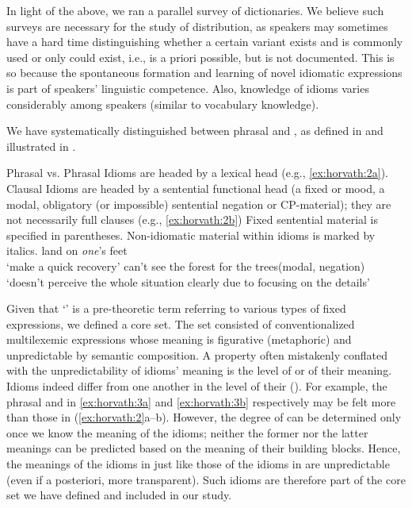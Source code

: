 \documentclass[output=paper,
modfonts
]{LSP/langsci}
\begin{document}
In light of the above, we ran a parallel survey of  
dictionaries. We believe such surveys are necessary for the study of
 distribution, as speakers may sometimes have a hard time
distinguishing whether a certain  variant exists and is commonly
used or only could exist, i.e., is a priori possible, but is not
documented. This is so because the spontaneous formation and learning of
novel idiomatic expressions is part of speakers' linguistic competence.
Also, knowledge of idioms varies considerably among speakers (similar to
vocabulary knowledge).

We have systematically distinguished between phrasal and ,
as defined in  and illustrated in .

\ea \label{ex:horvath:1} Phrasal vs. 
	\ea \label{ex:horvath:1a} Phrasal Idioms are headed by a lexical head (e.g., \ref{ex:horvath:2a}).
	\ex \label{ex:horvath:1b} Clausal Idioms are headed by a sentential functional head (a fixed
	 or mood, a modal, obligatory (or impossible) sentential negation
	or CP-material); they are not necessarily full clauses (e.g., \ref{ex:horvath:2b})
	\z
\z
Fixed sentential material is specified in parentheses. Non-idiomatic material within idioms is marked by italics.
\ea \label{ex:horvath:2}
	\ea \label{ex:horvath:2a} land on \emph{one}'s feet\\
	`make a quick recovery'
	\ex \label{ex:horvath:2b} can't see the forest for the trees\hfill (modal, negation)\\
	 `doesn't perceive the whole situation clearly due to focusing on the details'
	\z
\z

Given that `' is a pre-theoretic term referring to various types of
fixed expressions, we defined a core set. The set consisted of
conventionalized multilexemic expressions whose meaning is figurative
(metaphoric) and unpredictable by semantic composition. A property often
mistakenly conflated with the unpredictability of idioms' meaning is the
level of  or  of their meaning. Idioms indeed differ
from one another in the level of their  (). For
example, the phrasal and  in \ref{ex:horvath:3a} and \ref{ex:horvath:3b} respectively
may be felt more  than those in (\ref{ex:horvath:2}a--b). However, the degree of
 can be determined only once we know the meaning of the idioms;
neither the former nor the latter meanings can be predicted based on the
meaning of their building blocks. Hence, the meanings of the idioms in
 just like those of the idioms in  are unpredictable (even if a
posteriori, more transparent). Such idioms are therefore part of the
core set we have defined and included in our study.
\end{document}
